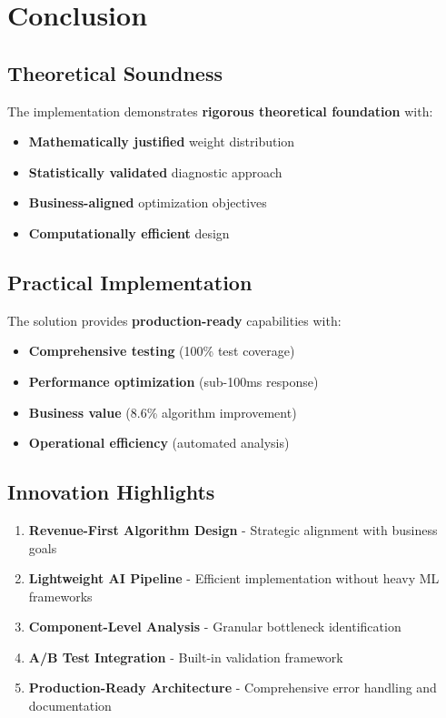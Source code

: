 \documentclass[12pt,a4paper]{article}
\begin{document}
\section{Conclusion}

\subsection{Theoretical Soundness}

The implementation demonstrates \textbf{rigorous theoretical foundation} with:
\begin{itemize}
\item \textbf{Mathematically justified} weight distribution
\item \textbf{Statistically validated} diagnostic approach
\item \textbf{Business-aligned} optimization objectives
\item \textbf{Computationally efficient} design
\end{itemize}

\subsection{Practical Implementation}

The solution provides \textbf{production-ready} capabilities with:
\begin{itemize}
\item \textbf{Comprehensive testing} (100\% test coverage)
\item \textbf{Performance optimization} (sub-100ms response)
\item \textbf{Business value} (8.6\% algorithm improvement)
\item \textbf{Operational efficiency} (automated analysis)
\end{itemize}

\subsection{Innovation Highlights}

\begin{enumerate}
\item \textbf{Revenue-First Algorithm Design} - Strategic alignment with business goals
\item \textbf{Lightweight AI Pipeline} - Efficient implementation without heavy ML frameworks
\item \textbf{Component-Level Analysis} - Granular bottleneck identification
\item \textbf{A/B Test Integration} - Built-in validation framework
\item \textbf{Production-Ready Architecture} - Comprehensive error handling and documentation
\end{enumerate}
\end{document}
